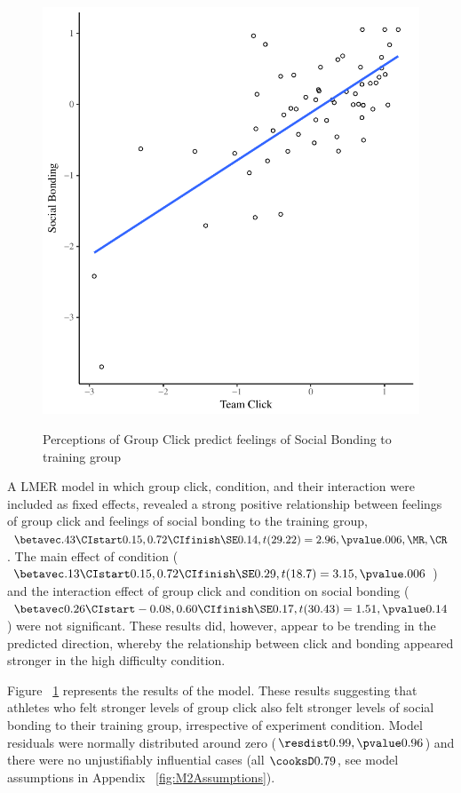 \begin{figure}
  \centering
    \includegraphics[width=0.5\linewidth,keepaspectratio] {images/groupClickBondScatter}
    \label{fig:groupClickBondScatter}
    \caption{Perceptions of Group Click predict feelings of Social Bonding to training group}
\end{figure}

A LMER model in which group click, condition, and their interaction were included as fixed effects, revealed a strong positive relationship between feelings of group click and feelings of social bonding to the training group, $\betavec .43 \CIstart 0.15, 0.72 \CIfinish \SE 0.14, t(29.22) = 2.96, \pvalue .006, \MR , \CR $.
The main effect of condition ($\betavec .13 \CIstart 0.15, 0.72 \CIfinish \SE 0.29, t(18.7) = 3.15, \pvalue .006$) and the interaction effect of group click and condition on social bonding ($\betavec 0.26 \CIstart -0.08, 0.60 \CIfinish \SE 0.17, t(30.43) = 1.51, \pvalue 0.14$) were not significant.  These results did, however, appear to be trending in the predicted direction, whereby the relationship between click and bonding appeared stronger in the high difficulty condition.

Figure ~\ref{fig:groupClickBondScatter} represents the results of the model.  These results suggesting that athletes who felt stronger levels of group click also felt stronger levels of social bonding to their training group, irrespective of experiment condition.  Model residuals were normally distributed around zero ($\resdist 0.99, \pvalue 0.96$) and there were no unjustifiably influential cases (all $\cooksD 0.79$, see model assumptions in Appendix ~\ref{fig:M2Assumptions}).








